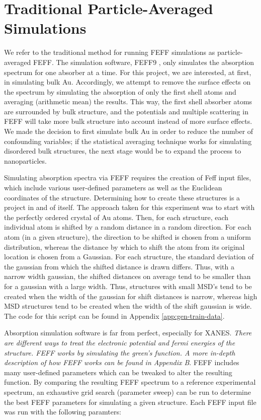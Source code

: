 \section{Traditional Particle-Averaged Simulations} 
\label{sec:traditional-disorder}
We refer to the traditional method for running FEFF simulations as particle-averaged FEFF. The simulation software, FEFF9 \cite{feff-citation}, only simulates the absorption spectrum for one absorber at a time. For this project, we are interested, at first, in simulating bulk Au. Accordingly, we attempt to remove the surface effects on the spectrum by simulating the absorption of only the first shell atoms and averaging (arithmetic mean) the results. This way, the first shell absorber atoms are surrounded by bulk structure, and the potentials and multiple scattering in FEFF will take more bulk structure into account instead of more surface effects. We made the decision to first simulate bulk Au in order to reduce the number of confounding variables; if the statistical averaging technique works for simulating disordered bulk structures, the next stage would be to expand the process to nanoparticles. 

Simulating absorption spectra via FEFF requires the creation of Feff input files, which include various user-defined parameters as well as the Euclidean coordinates of the structure. Determining how to create these structures is a project in and of itself. The approach taken for this experiment was to start with the perfectly ordered crystal of Au atoms. Then, for each structure, each individual atom is shifted by a random distance in a random direction. For each atom (in a given structure), the direction to be shifted is chosen from a uniform distribution, whereas the distance by which to shift the atom from its original location is chosen from a Gaussian. For each structure, the standard deviation of the gaussian from which the shifted distance is drawn differs. Thus, with a narrow width gaussian, the shifted distances on average tend to be smaller than for a gaussian with a large width. Thus, structures with small MSD's tend to be created when the width of the gaussian for shift distances is narrow, whereas high MSD structures tend to be created when the width of the shift gaussian is wide. The code for this script can be found in Appendix \ref{app:gen-train-data}.

Absorption simulation software is far from perfect, especially for XANES. \textit{There are different ways to treat the electronic potential and fermi energies of the structure. FEFF works by simulating the green's function. A more in-depth description of how FEFF works can be found in Appendix B}. FEFF includes many user-defined parameters which can be tweaked to alter the resulting function. By comparing the resulting FEFF spectrum to a reference experimental spectrum, an exhaustive grid search (parameter sweep) can be run to determine the best FEFF parameters for simulating a given structure. Each FEFF input file was run with the following paramters:

